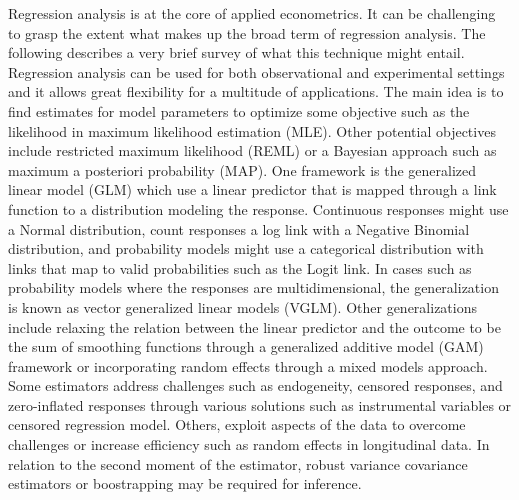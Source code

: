 \documentclass{juliacon}
\begin{document}
Regression analysis is at the core of applied econometrics. It can be challenging to grasp the extent what makes up the broad term of regression analysis. The following describes a very brief survey of what this technique might entail. Regression analysis can be used for both observational and experimental settings and it allows great flexibility for a multitude of applications. The main idea is to find estimates for model parameters to optimize some objective such as the likelihood in maximum likelihood estimation (MLE). Other potential objectives include restricted maximum likelihood (REML) or a Bayesian approach such as maximum a posteriori probability (MAP). One framework is the generalized linear model (GLM) which use a linear predictor that is mapped through a link function to a distribution modeling the response. Continuous responses might use a Normal distribution, count responses a log link with a Negative Binomial distribution, and probability models might use a categorical distribution with links that map to valid probabilities such as the Logit link. In cases such as probability models where the responses are multidimensional, the generalization is known as vector generalized linear models (VGLM). Other generalizations include relaxing the relation between the linear predictor and the outcome to be the sum of smoothing functions through a generalized additive model (GAM) framework or incorporating random effects through a mixed models approach. Some estimators address challenges such as endogeneity, censored responses, and zero-inflated responses through various solutions such as instrumental variables or censored regression model. Others, exploit aspects of the data to overcome challenges or increase efficiency such as random effects in longitudinal data. In relation to the second moment of the estimator, robust variance covariance estimators or boostrapping may be required for inference.
\end{document}
